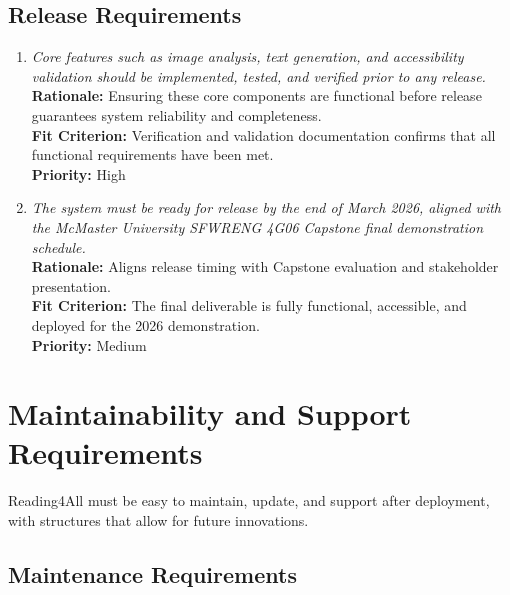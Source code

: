\documentclass[12pt]{article}
\begin{document}
\subsection{Release Requirements}

\begin{enumerate}[label=OER-RL\arabic*., wide=0pt, leftmargin=*]
  \item \emph{Core features such as image analysis, text generation, and accessibility validation should be implemented, tested, and verified prior to any release.}\\[2mm]
    {\bf Rationale:} Ensuring these core components are functional before release guarantees system reliability and completeness.\\
    {\bf Fit Criterion:} Verification and validation documentation confirms that all functional requirements have been met.\\
    {\bf Priority:} High

  \item \emph{The system must be ready for release by the end of March 2026,
      aligned with the McMaster University SFWRENG 4G06 Capstone final
    demonstration schedule.}\\[2mm]
    {\bf Rationale:} Aligns release timing with Capstone evaluation
    and stakeholder presentation.\\
    {\bf Fit Criterion:} The final deliverable is fully functional,
    accessible, and deployed for the 2026 demonstration.\\
    {\bf Priority:} Medium
\end{enumerate}

\section{Maintainability and Support Requirements}

Reading4All must be easy to maintain, update, and support after deployment, with structures that allow for future innovations.

\subsection{Maintenance Requirements}
\end{document}
